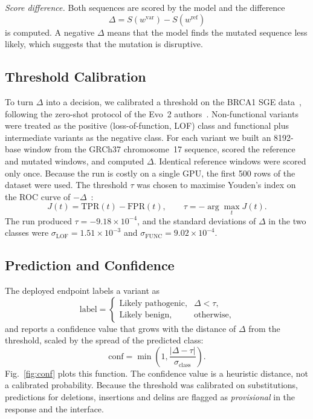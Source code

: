 \documentclass[conference,a4paper]{IEEEtran}
\begin{document}
\textit{Score difference.} Both sequences are scored by the model and the difference
\begin{equation}
\Delta = S(w^{\mathrm{var}}) - S(w^{\mathrm{ref}})
\label{eq:delta}
\end{equation}
is computed. A negative $\Delta$ means that the model finds the mutated sequence less likely, which suggests that the mutation is disruptive.

\subsection{Threshold Calibration}
To turn $\Delta$ into a decision, we calibrated a threshold on the BRCA1 SGE data~\cite{findlay2018brca1}, following the zero-shot protocol of the Evo~2 authors~\cite{brixi2026evo2}. Non-functional variants were treated as the positive (loss-of-function, LOF) class and functional plus intermediate variants as the negative class. For each variant we built an 8192-base window from the GRCh37 chromosome~17 sequence, scored the reference and mutated windows, and computed $\Delta$. Identical reference windows were scored only once. Because the run is costly on a single GPU, the first 500 rows of the dataset were used. The threshold $\tau$ was chosen to maximise Youden's index on the ROC curve of $-\Delta$~\cite{hanley1982roc,youden1950index}:
\begin{equation}
J(t)=\mathrm{TPR}(t)-\mathrm{FPR}(t), \qquad \tau=-\arg\max_t J(t).
\label{eq:youden}
\end{equation}
The run produced $\tau=-9.18\times10^{-4}$, and the standard deviations of $\Delta$ in the two classes were $\sigma_{\mathrm{LOF}}=1.51\times10^{-3}$ and $\sigma_{\mathrm{FUNC}}=9.02\times10^{-4}$.

\subsection{Prediction and Confidence}
The deployed endpoint labels a variant as
\begin{equation}
\mathrm{label}=\begin{cases}
\text{Likely pathogenic}, & \Delta < \tau,\\
\text{Likely benign}, & \text{otherwise},
\end{cases}
\label{eq:call}
\end{equation}
and reports a confidence value that grows with the distance of $\Delta$ from the threshold, scaled by the spread of the predicted class:
\begin{equation}
\mathrm{conf}=\min\!\left(1,\frac{|\Delta-\tau|}{\sigma_{\mathrm{class}}}\right).
\label{eq:conf}
\end{equation}
Fig.~\ref{fig:conf} plots this function. The confidence value is a heuristic distance, not a calibrated probability. Because the threshold was calibrated on substitutions, predictions for deletions, insertions and delins are flagged as \emph{provisional} in the response and the interface.
\end{document}
